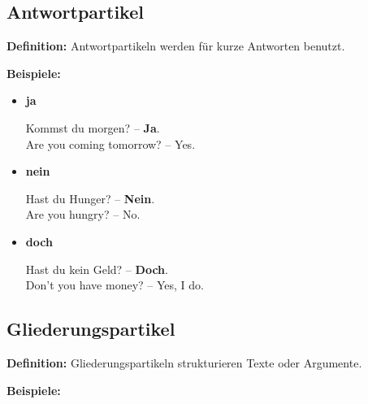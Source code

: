 \documentclass{article}
\begin{document}
        \subsection{Antwortpartikel}
            
            \textbf{Definition:} Antwortpartikeln werden für kurze Antworten benutzt.
            
            \textbf{Beispiele:}
            
            \begin{itemize}
                
                \item \textbf{ja}
                
                Kommst du morgen? -- \textbf{Ja}.\\
                Are you coming tomorrow? -- Yes.
                
                \item \textbf{nein}
                
                Hast du Hunger? -- \textbf{Nein}.\\
                Are you hungry? -- No.
                
                \item \textbf{doch}
                
                Hast du kein Geld? -- \textbf{Doch}.\\
                Don't you have money? -- Yes, I do.
            
            \end{itemize}
        
        \subsection{Gliederungspartikel}
            
            \textbf{Definition:} Gliederungspartikeln strukturieren Texte oder Argumente.
            
            \textbf{Beispiele:}
            
\end{document}
